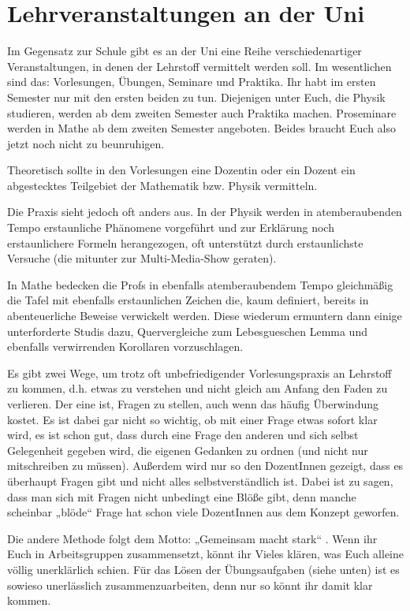 \section{Lehrveranstaltungen an der Uni}
Im Gegensatz zur Schule gibt es an der Uni eine Reihe verschiedenartiger Veranstaltungen, in denen der Lehrstoff vermittelt werden soll. Im wesentlichen sind das: Vorlesungen, Übungen, Seminare und Praktika. Ihr habt im ersten Semester nur mit den ersten beiden zu tun. Diejenigen unter Euch, die Physik studieren, werden ab dem zweiten Semester auch Praktika machen. Proseminare werden in Mathe ab dem zweiten Semester angeboten. Beides braucht Euch also jetzt noch nicht zu beunruhigen.

Theoretisch sollte in den Vorlesungen eine Dozentin oder ein Dozent ein abgestecktes Teilgebiet der Mathematik bzw. Physik vermitteln.

Die Praxis sieht jedoch oft anders aus. In der Physik werden in atemberaubenden Tempo erstaunliche Phänomene vorgeführt und zur Erklärung noch erstaunlichere Formeln herangezogen, oft unterstützt durch erstaunlichste Versuche (die mitunter zur Multi-Media-Show geraten).

In Mathe bedecken die Profs in ebenfalls atemberaubendem Tempo gleichmäßig die Tafel mit ebenfalls erstaunlichen Zeichen die, kaum definiert, bereits in abenteuerliche Beweise verwickelt werden. Diese wiederum ermuntern dann einige unterforderte Studis dazu, Quervergleiche zum Lebesgueschen Lemma und ebenfalls verwirrenden Korollaren vorzuschlagen.

Es gibt zwei Wege, um trotz oft unbefriedigender Vorlesungspraxis an Lehrstoff zu kommen, d.h. etwas zu verstehen und nicht gleich am Anfang den Faden zu verlieren. Der eine ist, Fragen zu stellen, auch wenn das häufig Überwindung kostet. Es ist dabei gar nicht so wichtig, ob mit einer Frage etwas sofort klar wird, es ist schon gut, dass durch eine Frage den anderen und sich selbst Gelegenheit gegeben wird, die eigenen Gedanken zu ordnen (und nicht nur mitschreiben zu müssen). Außerdem wird nur so den DozentInnen gezeigt, dass es überhaupt Fragen gibt und nicht alles selbstverständlich ist. Dabei ist zu sagen, dass man sich mit Fragen nicht unbedingt eine Blöße gibt, denn manche scheinbar „blöde“ Frage hat schon viele DozentInnen aus dem Konzept geworfen.

Die andere Methode folgt dem Motto: „Gemeinsam macht stark“ . Wenn ihr Euch in Arbeitsgruppen zusammensetzt, könnt ihr Vieles klären, was Euch alleine völlig unerklärlich schien. Für das Lösen der Übungsaufgaben (siehe unten) ist es sowieso unerlässlich zusammenzuarbeiten, denn nur so könnt ihr damit klar kommen.

